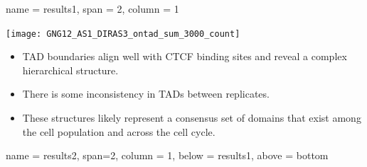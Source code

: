 \documentclass[a0paper, portrait]{baposter}
\begin{document}
\begin{poster}
{}




 {
	name = results1, span = 2, column = 1}{ 
\begin{center}
\texttt{[image: GNG12\_AS1\_DIRAS3\_ontad\_sum\_3000\_count]}
\end{center}

\begin{itemize}[leftmargin=*]
\item TAD boundaries align well with CTCF binding sites and reveal a complex hierarchical structure.
\item There is some inconsistency in TADs \cite{An2019} between replicates.
\item These structures likely represent a consensus set of domains that exist among the cell population and across the cell cycle.
\end{itemize}

}

 {
	name = results2, span=2, column = 1, 
	below = results1, above = bottom}{

}
\end{poster}
\end{document}
